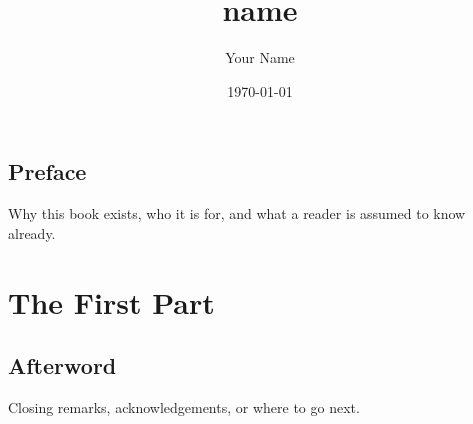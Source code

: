 \documentclass[11pt,a4paper,twoside,openright]{book}
\title{{name}}
\author{Your Name}
\date{\today}
\begin{document}
\frontmatter

\maketitle

\chapter*{Preface}

Why this book exists, who it is for, and what a reader is assumed to
know already.

\tableofcontents

\mainmatter

\part{The First Part}




\backmatter

\chapter*{Afterword}

Closing remarks, acknowledgements, or where to go next.
\end{document}
